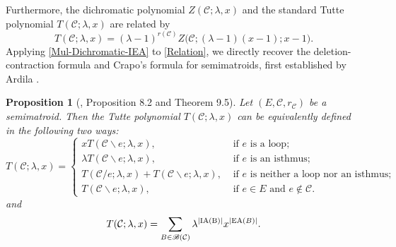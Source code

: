 \documentclass[12pt]{article}%
\numberwithin{equation}{section}
\newtheorem{proposition}[proposition]{Proposition}
\begin{document}
Furthermore, the dichromatic polynomial $Z(\mathcal{C};\lambda,x)$ and the standard Tutte polynomial $T(\mathcal{C};\lambda,x)$ are related by 
\begin{equation}\label{Relation}
T(\mathcal{C};\lambda,x)=(\lambda-1)^{r(\mathcal{C})}Z\big(\mathcal{C};(\lambda-1)(x-1);x-1\big).
\end{equation}
Applying \autoref{Mul-Dichromatic-IEA} to \eqref{Relation},  we directly recover the deletion-contraction formula and Crapo's formula for semimatroids, first established by Ardila \cite{Ardila2007}.
\begin{proposition}[\cite{Ardila2007}, Proposition 8.2 and Theorem 9.5]
Let $(E,\mathcal{C},r_{\mathcal{C}})$ be a semimatroid. Then the Tutte polynomial $T(\mathcal{C};\lambda,x)$ can be equivalently defined in the following two ways:
\[
T(\mathcal{C};\lambda,x)=
\begin{cases}
xT(\mathcal{C}\backslash e;\lambda,x),&\text{ if } e \text{ is a loop};\\
\lambda T(\mathcal{C}\backslash e;\lambda,x),&\text{ if } e \text{ is an isthmus};\\
T(\mathcal{C}/e;\lambda,x)+T(\mathcal{C}\backslash e;\lambda,x),&\text{ if } e \text{ is neither a loop nor an isthmus};\\
T(\mathcal{C}\backslash e;\lambda,x),&\text{ if } e\in E \text{ and } e\notin\mathcal{C}.
\end{cases}
\]
and
\[
T(\mathcal{C};\lambda,x)=\sum_{B\in\mathscr{B}(\mathcal{C})}\lambda^{|{\rm IA(B)}|}x^{|{\rm EA}(B)|}.
\]
\end{proposition}
\end{document}
